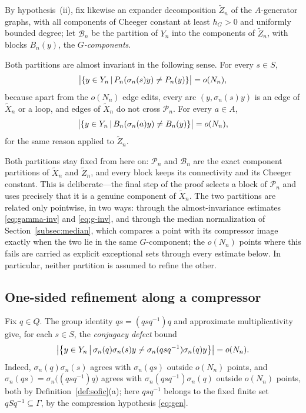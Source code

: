 \documentclass[11pt]{amsart}
\theoremstyle{definition}
\theoremstyle{plain}
\newcommand{\cP}{\mathcal P}
\newcommand{\cB}{\mathcal B}
\DeclarePairedDelimiter{\abs}{\lvert}{\rvert}
\newcommand{\set}[1]{\left\{#1\right\}}
\newcommand{\suchthat}{\,\middle|\,}
\begin{document}
By hypothesis~(ii), fix likewise an expander decomposition \(\widetilde Z_n\) of the \(A\)-generator graphs, with all components of Cheeger constant at least \(h_G>0\) and uniformly bounded degree; let \(\cB_n\) be the partition of \(Y_n\) into the components of \(\widetilde Z_n\), with blocks \(B_n(y)\), the \emph{\(G\)-components}.

Both partitions are almost invariant in the following sense.  For every \(s\in S\),
\begin{equation}\label{eq:gamma-inv}
 \abs[\big]{\set{y\in Y_n\suchthat P_n(\sigma_n(s)y)\ne P_n(y)}}=o(N_n),
\end{equation}
because apart from the \(o(N_n)\) edge edits, every arc \((y,\sigma_n(s)y)\) is an edge of \(\widetilde X_n\) or a loop, and edges of \(\widetilde X_n\) do not cross \(\cP_n\).  For every \(a\in A\),
\begin{equation}\label{eq:g-inv}
 \abs[\big]{\set{y\in Y_n\suchthat B_n(\sigma_n(a)y)\ne B_n(y)}}=o(N_n),
\end{equation}
for the same reason applied to \(\widetilde Z_n\).

Both partitions stay fixed from here on: \(\cP_n\) and \(\cB_n\) are the exact component partitions of \(\widetilde X_n\) and \(\widetilde Z_n\), and every block keeps its connectivity and its Cheeger constant.  This is deliberate---the final step of the proof selects a block of \(\cP_n\) and uses precisely that it is a genuine component of \(\widetilde X_n\).  The two partitions are related only pointwise, in two ways: through the almost-invariance estimates \eqref{eq:gamma-inv} and \eqref{eq:g-inv}, and through the median normalization of Section~\ref{subsec:median}, which compares a point with its compressor image exactly when the two lie in the same \(G\)-component; the \(o(N_n)\) points where this fails are carried as explicit exceptional sets through every estimate below.  In particular, neither partition is assumed to refine the other.

\subsection{One-sided refinement along a compressor}\label{subsec:onesided}

Fix \(q\in Q\).  The group identity \(qs=(qsq^{-1})q\) and approximate multiplicativity give, for each \(s\in S\), the \emph{conjugacy defect} bound
\begin{equation}\label{eq:conj}
 \abs[\big]{\set{y\in Y_n\suchthat \sigma_n(q)\sigma_n(s)y\ne\sigma_n(qsq^{-1})\sigma_n(q)y}}=o(N_n).
\end{equation}
Indeed, \(\sigma_n(q)\sigma_n(s)\) agrees with \(\sigma_n(qs)\) outside \(o(N_n)\) points, and \(\sigma_n(qs)=\sigma_n\bigl((qsq^{-1})q\bigr)\) agrees with \(\sigma_n(qsq^{-1})\sigma_n(q)\) outside \(o(N_n)\) points, both by Definition~\ref{def:sofic}(a); here \(qsq^{-1}\) belongs to the fixed finite set \(qSq^{-1}\subseteq\Gamma\), by the compression hypothesis \eqref{eq:gen}.
\end{document}
